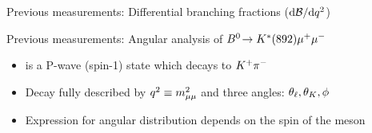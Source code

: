 \documentclass[aspectratio=1610]{beamer}
\begin{document}
\begin{frame}{Previous measurements: Differential branching fractions ($\mathrm{d}{\mathcal{B}}/\mathrm{d}{q^2}$)}
\end{frame}

\begin{frame}{Previous measurements: Angular analysis of ${{B}^0}\!\rightarrow {\ensuremath{K}}^{*}(892){\mu^+}{\mu^-}$}

\begin{itemize}
\item \KstP is a P-wave (spin-1) state which decays to ${{K}^+}{{\pi}^-}$
\item Decay fully described by ${q^2}\equiv m_{\mu\mu}^{2}$ and three angles: $\theta_\ell,\theta_K,\phi$
\item Expression for angular distribution depends on the spin of the \Kstar meson
\end{itemize}


\end{frame}
\end{document}
